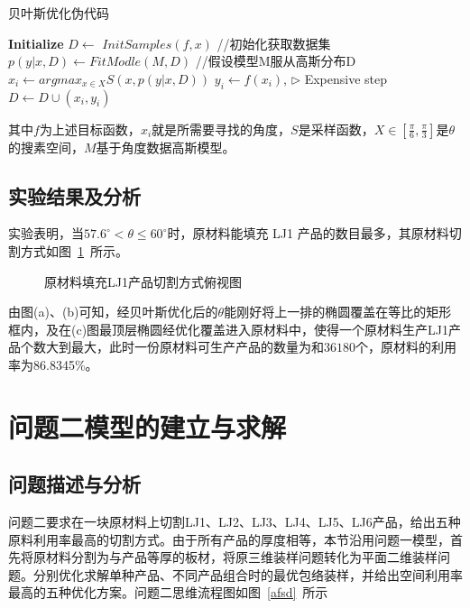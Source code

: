 \documentclass{whutmod}
\newcommand{\upcite}[1]{\textsuperscript{\cite{#1}}}
\begin{document}
			\begin{algorithm}[H]
			 	\caption{贝叶斯优化伪代码}  
			 	\LinesNumbered  
			 	\textbf{Initialize} \newline
			 	 $D \leftarrow $ $InitSamples(f,x)$	\quad //初始化获取数据集\newline
			 	{
			 		$p(y|x,D)\leftarrow \textit{FitModle}(M, D)$  \quad\quad //假设模型M服从高斯分布D\newline
			 		$x_i\leftarrow argmax_{x\in X}S(x,p(y|x,D))$\newline
			 		$y_i\leftarrow f(x_i)$, $\triangleright$ Expensive step\newline
			 		 $D \leftarrow D\cup (x_i,y_i)$
			 	}
			\end{algorithm} 
		其中$f$为上述目标函数，$x_i$就是所需要寻找的角度，$S$是采样函数，$X\in [\frac{\pi}{6},\frac{\pi}{3}]$是$\theta$的搜素空间，$M$基于角度数据高斯模型\upcite{bib:8}。
        \subsection{实验结果及分析}
        实验表明，当$ 57.6^{\circ}< \theta \leqslant  60^{\circ}$时，原材料能填充 LJ1 产品的数目最多，其原材料切割方式如图~\ref{ccsdc}~所示。
        \begin{figure}[H]
        	\centering
		\caption{原材料填充LJ1产品切割方式俯视图}\label{ccsdc}
        \end{figure}
    
    由图(a)、(b)可知，经贝叶斯优化后的$\theta$能刚好将上一排的椭圆覆盖在等比的矩形框内，及在(c)图最顶层椭圆经优化覆盖进入原材料中，使得一个原材料生产LJ1产品个数大到最大，此时一份原材料可生产产品的数量为和$36180$个，原材料的利用率为86.8345\%。

	\section{问题二模型的建立与求解}
		\subsection{问题描述与分析}
			问题二要求在一块原材料上切割LJ1、LJ2、LJ3、LJ4、LJ5、LJ6产品，给出五种原料利用率最高的切割方式。由于所有产品的厚度相等，本节沿用问题一模型，首先将原材料分割为与产品等厚的板材，将原三维装样问题转化为平面二维装样问题。分别优化求解单种产品、不同产品组合时的最优包络装样，并给出空间利用率最高的五种优化方案。问题二思维流程图如图~\ref{afsd}~所示
			
\end{document}
